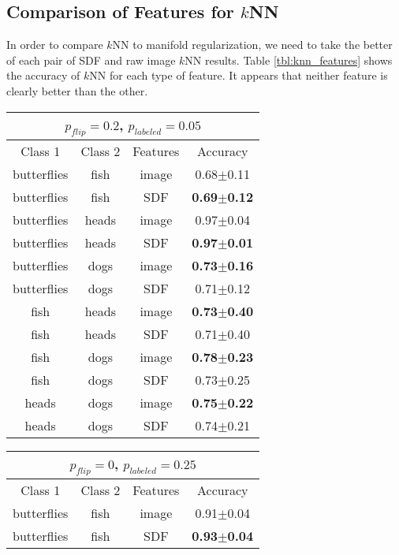 \documentclass[anon,11pt]{9520} %
\begin{document}
\subsection{Comparison of Features for $k$NN}
In order to compare $k$NN to manifold regularization, we need to take the better
of each pair of SDF and raw image $k$NN results. Table \ref{tbl:knn_features}
shows the accuracy of $k$NN for each type of feature. It appears that neither
feature is clearly better than the other.
\begin{table}
\tiny
\begin{center}
\begin{tabular}{|c|c|c|c|}
\multicolumn{4}{c}{$p_{flip} = 0.2$, $p_{labeled} = 0.05$}\\
\hline
Class 1 & Class 2 & Features & Accuracy\\
\hline
butterflies&	fish&	image&	0.68$\pm$0.11\\
butterflies&	fish&	SDF&	\textbf{0.69$\pm$0.12}\\\hline

butterflies&	heads&	image&	0.97$\pm$0.04\\
butterflies&	heads&	SDF&	\textbf{0.97$\pm$0.01}\\\hline

butterflies&	dogs&	image&	\textbf{0.73$\pm$0.16}\\
butterflies&	dogs&	SDF&	0.71$\pm$0.12\\\hline

fish&	heads&	image&		\textbf{0.73$\pm$0.40}\\
fish&	heads&	SDF&		0.71$\pm$0.40\\\hline

fish&	dogs&	image&		\textbf{0.78$\pm$0.23}\\
fish&	dogs&	SDF&		0.73$\pm$0.25\\\hline

heads&	dogs&	image&		\textbf{0.75$\pm$0.22}\\
heads&	dogs&	SDF&		0.74$\pm$0.21\\\hline
\end{tabular}
\begin{tabular}{|c|c|c|c|}
\multicolumn{4}{c}{$p_{flip} = 0$, $p_{labeled} = 0.25$}\\
\hline
Class 1 & Class 2 & Features & Accuracy\\
\hline
butterflies&	fish&	image&	0.91$\pm$0.04\\
butterflies&	fish&	SDF&	\textbf{0.93$\pm$0.04}\\\hline


\end{tabular}
\end{center}
\end{table}
\end{document}
